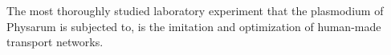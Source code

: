The most thoroughly studied laboratory experiment that the plasmodium of Physarum is subjected to, is the imitation and optimization of human-made transport networks.